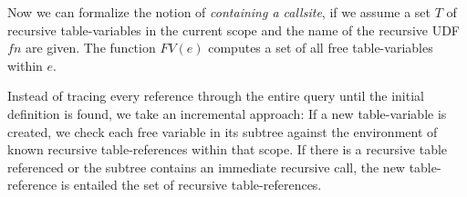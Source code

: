Now we can formalize the notion of \textit{containing a callsite}, if we assume a set $T$ of recursive table-variables in the current scope and the name of the recursive UDF $fn$ are given. The function $FV(e)$ computes a set of all free table-variables within $e$.





Instead of tracing every reference through the entire query until the initial definition is found, we take an incremental approach: If a new table-variable is created, we check each free variable in its subtree against the environment of known recursive table-references within that scope. If there is a recursive table referenced or the subtree contains an immediate recursive call, the new table-reference is entailed the set of recursive table-references.



